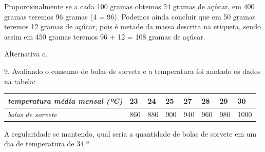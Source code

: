 \begin{escolha}
\begin{boxmedio}
\begin{boxmedio}
{\begin{boxpeq}
\begin{boxpeq}
{\begin{boxpeq}
\begin{boxmedio}
\begin{boxmedio}
\begin{boxpeq}
\begin{boxmedio}
\begin{boxpeq}
\begin{boxpeq}
\begin{boxpeq}
\begin{boxpeq}
\begin{boxmedio}
{\begin{boxmedio}
\begin{boxmedio}
\begin{boxpeq}
\begin{boxmedio}
\begin{boxpeq}
\begin{boxpeq}
\begin{boxpeq}
\begin{escolha}
{\begin{boxmedio}
\begin{boxpeq}
\begin{boxpeq}
\begin{boxpeq}
\begin{boxpeq}
\begin{boxpeq}
\begin{boxmedio}
\begin{boxpeq}
\begin{boxpeq}
\begin{boxpeq}
{\begin{boxpeq}
\begin{boxmedio}
\begin{boxpeq}
\begin{boxpeq}
\begin{boxpeq}
{\begin{boxpeq}
\begin{boxmedio}
{\begin{boxpeq}
\begin{boxpeq}
\begin{boxmedio}
\begin{boxmedio}
\begin{boxpeq}
\begin{boxpeq}
{\begin{boxpeq}
\begin{boxpeq}
\begin{boxpeq}
\begin{boxpeq}
\begin{boxpeq}
\begin{escolha}
\begin{escolha}
{\begin{boxmedio}
\begin{boxpeq}
\begin{q°}
\begin{boxmedio}
\begin{boxpeq}
\begin{boxpeq}
\begin{boxmedio}
\begin{boxmedio}
\begin{boxmedio}
\begin{boxmedio}
{\begin{escolha}
\begin{escolha}
\begin{escolha}
\begin{escolha}
\begin{escolha}
\begin{escolha}
{Proporcionalmente se a cada 100 gramas obtemos 24 gramas de açúcar, em
400 gramas teremos 96 gramas (4  = 96). Podemos ainda concluir que
em 50 gramas teremos 12 gramas de açúcar, pois é metade da massa
descrita na etiqueta, sendo assim em 450 gramas teremos 96 + 12 = 108
gramas de açúcar.

Alternativa c.

9. Avaliando o consumo de bolas de sorvete e a temperatura foi anotado
os dados na tabela:

\begin{longtable}[]{@{}llllllll@{}}
\toprule\noalign{}
\emph{temperatura média mensal (ºC)} & \textbf{23} & \textbf{24} &
\textbf{25} & \textbf{27} & \textbf{28} & \textbf{29} & \textbf{30} \\
\midrule\noalign{}
\endhead
\bottomrule\noalign{}
\endlastfoot
\emph{bolas de sorvete} & 860 & 880 & 900 & 940 & 960 & 980 & 1000 \\
\end{longtable}

A regularidade se mantendo, qual seria a quantidade de bolas de sorvete
em um dia de temperatura de 34 º

}
\end{escolha}
\end{escolha}
\end{escolha}
\end{escolha}
\end{escolha}
\end{escolha}}
\end{boxmedio}
\end{boxmedio}
\end{boxmedio}
\end{boxmedio}
\end{boxpeq}
\end{boxpeq}
\end{boxmedio}
\end{q°}
\end{boxpeq}
\end{boxmedio}}
\end{escolha}
\end{escolha}
\end{boxpeq}
\end{boxpeq}
\end{boxpeq}
\end{boxpeq}
\end{boxpeq}}
\end{boxpeq}
\end{boxpeq}
\end{boxmedio}
\end{boxmedio}
\end{boxpeq}
\end{boxpeq}}
\end{boxmedio}
\end{boxpeq}}
\end{boxpeq}
\end{boxpeq}
\end{boxpeq}
\end{boxmedio}
\end{boxpeq}}
\end{boxpeq}
\end{boxpeq}
\end{boxpeq}
\end{boxmedio}
\end{boxpeq}
\end{boxpeq}
\end{boxpeq}
\end{boxpeq}
\end{boxpeq}
\end{boxmedio}}
\end{escolha}
\end{boxpeq}
\end{boxpeq}
\end{boxpeq}
\end{boxmedio}
\end{boxpeq}
\end{boxmedio}
\end{boxmedio}}
\end{boxmedio}
\end{boxpeq}
\end{boxpeq}
\end{boxpeq}
\end{boxpeq}
\end{boxmedio}
\end{boxpeq}
\end{boxmedio}
\end{boxmedio}
\end{boxpeq}}
\end{boxpeq}
\end{boxpeq}}
\end{boxmedio}
\end{boxmedio}
\end{escolha}
